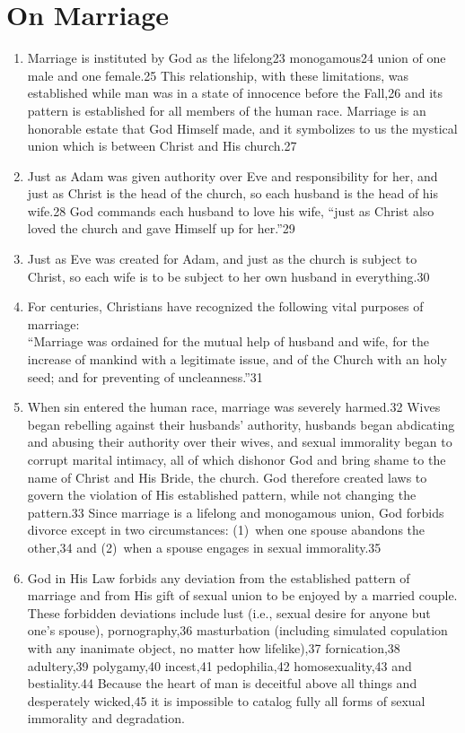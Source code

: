 \documentclass[
]{book}
\begin{document}
\hypertarget{on-marriage}{%
\section*{On Marriage}\label{on-marriage}}

\begin{enumerate}
\def\labelenumi{\arabic{enumi}.}
\setcounter{enumi}{8}
\item
  Marriage is instituted by God as the lifelong23 monogamous24 union of one male and one female.25 This relationship, with these limitations, was established while man was in a state of innocence before the Fall,26 and its pattern is established for all members of the human race. Marriage is an honorable estate that God Himself made, and it symbolizes to us the mystical union which is between Christ and His church.27
\item
  Just as Adam was given authority over Eve and responsibility for her, and just as Christ is the head of the church, so each husband is the head of his wife.28 God commands each husband to love his wife, ``just as Christ also loved the church and gave Himself up for her.''29
\item
  Just as Eve was created for Adam, and just as the church is subject to Christ, so each wife is to be subject to her own husband in everything.30
\item
  For centuries, Christians have recognized the following vital purposes of marriage:\\
  ``Marriage was ordained for the mutual help of husband and wife, for the increase of mankind with a legitimate issue, and of the Church with an holy seed; and for preventing of uncleanness.''31
\item
  When sin entered the human race, marriage was severely harmed.32 Wives began rebelling against their husbands' authority, husbands began abdicating and abusing their authority over their wives, and sexual immorality began to corrupt marital intimacy, all of which dishonor God and bring shame to the name of Christ and His Bride, the church. God therefore created laws to govern the violation of His established pattern, while not changing the pattern.33 Since marriage is a lifelong and monogamous union, God forbids divorce except in two circumstances: (1)~when one spouse abandons the other,34 and (2)~when a spouse engages in sexual immorality.35
\item
  God in His Law forbids any deviation from the established pattern of marriage and from His gift of sexual union to be enjoyed by a married couple. These forbidden deviations include lust (i.e., sexual desire for anyone but one's spouse), pornography,36 masturbation (including simulated copulation with any inanimate object, no matter how lifelike),37 fornication,38 adultery,39 polygamy,40 incest,41 pedophilia,42 homosexuality,43 and bestiality.44 Because the heart of man is deceitful above all things and desperately wicked,45 it is impossible to catalog fully all forms of sexual immorality and degradation.

\end{enumerate}
\end{document}
